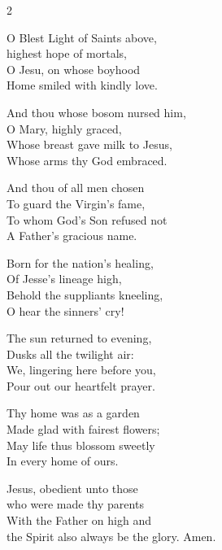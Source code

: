 \begin{multicols}{2}
\raggedcolumns
\begin{enpars}
O Blest Light of Saints above,\\
highest hope of mortals,\\
O Jesu, on whose boyhood\\
Home smiled with kindly love.

And thou whose bosom nursed him,\\
O Mary, highly graced,\\
Whose breast gave milk to Jesus,\\
Whose arms thy God embraced.

And thou of all men chosen\\
To guard the Virgin’s fame,\\
To whom God’s Son refused not\\
A Father’s gracious name.

Born for the nation’s healing,\\
Of Jesse’s lineage high,\\
Behold the suppliants kneeling,\\
O hear the sinners’ cry!

The sun returned to evening,\\
Dusks all the twilight air:\\
We, lingering here before you,\\
Pour out our heartfelt prayer.

Thy home was as a garden\\
Made glad with fairest flowers;\\
May life thus blossom sweetly\\
In every home of ours.

Jesus, obedient unto those\\
who were made thy parents\\
With the Father on high and \\ the Spirit also
always be the glory.
Amen.
\end{enpars}
\end{multicols}